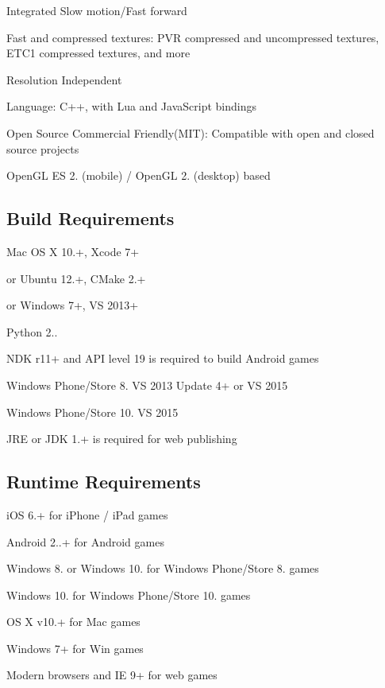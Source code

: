 \begin{DoxyItemize}
\item Integrated Slow motion/\+Fast forward
\item Fast and compressed textures\+: P\+VR compressed and uncompressed textures, E\+T\+C1 compressed textures, and more
\item Resolution Independent
\item Language\+: C++, with Lua and Java\+Script bindings
\item Open Source Commercial Friendly(\+M\+I\+T)\+: Compatible with open and closed source projects
\item Open\+GL ES 2. (mobile) / Open\+GL 2. (desktop) based
\end{DoxyItemize}

\subsection*{Build Requirements }


\begin{DoxyItemize}
\item Mac OS X 10.+, Xcode 7+
\item or Ubuntu 12.+, C\+Make 2.+
\item or Windows 7+, VS 2013+
\item Python 2..
\item N\+DK r11+ and A\+PI level 19 is required to build Android games
\item Windows Phone/\+Store 8. VS 2013 Update 4+ or VS 2015
\item Windows Phone/\+Store 10. VS 2015
\item J\+RE or J\+DK 1.+ is required for web publishing
\end{DoxyItemize}

\subsection*{Runtime Requirements }


\begin{DoxyItemize}
\item i\+OS 6.+ for i\+Phone / i\+Pad games
\item Android 2..+ for Android games
\item Windows 8. or Windows 10. for Windows Phone/\+Store 8. games
\item Windows 10. for Windows Phone/\+Store 10. games
\item OS X v10.+ for Mac games
\item Windows 7+ for Win games
\item Modern browsers and IE 9+ for web games
\end{DoxyItemize}

